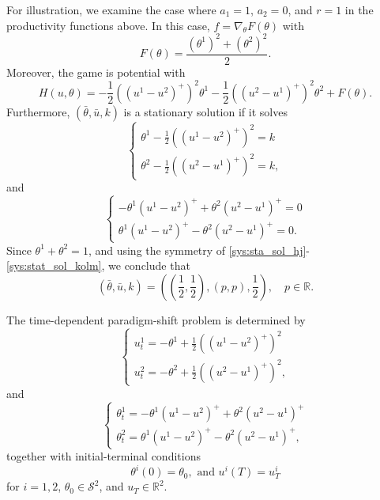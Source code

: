 \documentclass[12pt]{amsart}
\newcommand{\Rr}{{\mathbb{R}}}
\newcommand{\1}{{\chi}}
\newcommand{\lb}{\left(}
\newcommand{\rb}{\right)}
\newcommand{\Ss}{\mathcal{S}}
\theoremstyle{definition}
\begin{document}
        For illustration, we examine the case where
        $a_1=1$, $a_2=0$, and $r=1$ in the productivity functions above. In this case, $f=\nabla_\theta F(\theta)$ with \
\[
F(\theta)=\frac{(\theta^1)^2+(\theta^2)^2}{2}. 
\]
Moreover, the game is potential with
\[
H(u, \theta)=- \frac{1}{2}\lb (u^1-u^2)^+\rb^2\theta^1- \frac{1}{2}\lb (u^2-u^1)^+\rb^2\theta^2 +F(\theta).
\]
Furthermore, $(\bar \theta, \bar u,k)$ is a stationary solution if it solves
        \begin{equation} \label{sys:sta_sol_hj}
                \begin{cases}
                {\theta^1}-\frac{1}{2}((u^1-u^2)^+)^2=k\\
                {\theta^2}-\frac{1}{2}((u^2-u^1)^+)^2=k,
                \end{cases}
        \end{equation}
        and
        \begin{equation} \label{sys:stat_sol_kolm}
                \begin{cases}
                -\theta^1(u^1-u^2)^+ + \theta^2 (u^2-u^1)^+=0\\
                \theta^1(u^1-u^2)^+ - \theta^2 (u^2-u^1)^+=0.
                \end{cases}
        \end{equation}
        Since $\theta^1+\theta^2=1$, and using the symmetry of \eqref{sys:sta_sol_hj}-\eqref{sys:stat_sol_kolm}, we conclude that 
        \begin{equation}
        \label{ssf}
                (\bar \theta, \bar u, k) = \lb \lb\frac{1}{2},\frac{1}{2}\rb,(p,p), \frac{1}{2} \rb, \quad p \in \Rr.
        \end{equation}
                
        The time-dependent paradigm-shift problem 
        is determined by 
        \begin{equation} \label{sys:td_sol_hj}
                \begin{cases}
                        u^1_t=-{\theta^1}+\frac{1}{2}((u^1-u^2)^+)^2\\
                        u^2_t=-{\theta^2}+\frac{1}{2}((u^2-u^1)^+)^2,
                \end{cases}
        \end{equation}
        and
        \begin{equation} \label{sys:td_sol_kolm}
                \begin{cases}
                        \theta^1_t=-\theta^1(u^1-u^2)^+ + \theta^2 (u^2-u^1)^+\\
                        \theta^2_t=\theta^1(u^1-u^2)^+ - \theta^2 (u^2-u^1)^+, 
                \end{cases}
        \end{equation}
        together with initial-terminal conditions 
        \begin{equation*}
                \theta^i(0) = \theta_0, \text{ and } u^i(T) = u_T^i
        \end{equation*}
        for $i=1,2$, $\theta_0\in \Ss^2$, and $u_T\in \Rr^2$. 
\end{document}
